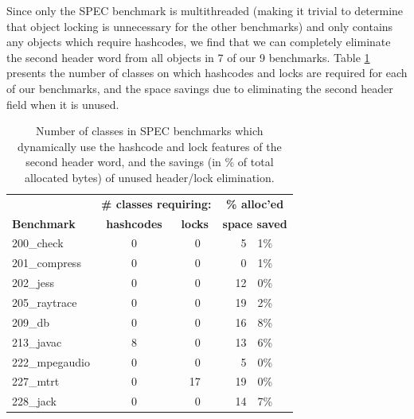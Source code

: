 \documentclass[preprint]{acmconf}
\begin{document}
Since only the SPEC benchmark  is multithreaded
(making it trivial to determine that object locking is unnecessary
for the other benchmarks)
and only  contains
any objects which require hashcodes, we find that we can completely
eliminate the second header word from all objects in 7 of our 9 benchmarks.
Table \ref{tab:hashlock-opt} presents the number of classes on which
hashcodes and locks are required for each of our benchmarks, and the
space savings due to eliminating the second header field when it is
unused.
\begin{table}
\begin{tabular}{lccr@{.}l}
&\multicolumn{2}{c}{\bf\# classes requiring:}&\multicolumn{2}{c}{\bf\% alloc'ed}\\
\bf Benchmark &\bf hashcodes&\bf locks&\multicolumn{2}{c}{\bf space saved}\\\hline
200\_check	&   0 &   ~0   &  5&1\% \\
201\_compress	&   0 &   ~0   &  0&1\% \\
202\_jess	&   0 &   ~0   & 12&0\% \\
205\_raytrace	&   0 &   ~0   & 19&2\% \\
209\_db 	&   0 &   ~0   & 16&8\% \\
213\_javac	&   8 &   ~0   & 13&6\% \\
222\_mpegaudio	&   0 &   ~0   &  5&0\% \\
227\_mtrt	&   0 &   17   & 19&0\% \\
228\_jack	&   0 &   ~0   & 14&7\% \\
\end{tabular}
\caption{Number of classes in SPEC benchmarks which dynamically use
  the hashcode and lock features of the second header word,
  and the savings (in \% of total allocated bytes) of unused header/lock
  elimination.}
\label{tab:hashlock-opt}
\end{table}
\end{document}
